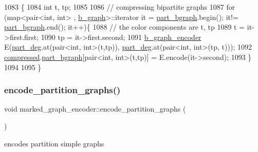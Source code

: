 \begin{DoxyCode}
1083 \{
1084   \textcolor{keywordtype}{int} t, tp;
1085 
1086   \textcolor{comment}{// compressing bipartite graphs }
1087   \textcolor{keywordflow}{for} (map<pair<int, int> , \hyperlink{classb__graph}{b\_graph}>::iterator it = \hyperlink{classmarked__graph__encoder_a5faebef707fb681c0b6c2ccf64abc04c}{part\_bgraph}.begin(); it!=
      \hyperlink{classmarked__graph__encoder_a5faebef707fb681c0b6c2ccf64abc04c}{part\_bgraph}.end(); it++)\{
1088     \textcolor{comment}{// the color components are t, tp}
1089     t = it->first.first; 
1090     tp = it->first.second; 
1091     \hyperlink{classb__graph__encoder}{b\_graph\_encoder} E(\hyperlink{classmarked__graph__encoder_a55ea2edb2609dfc287432f61900d6ad1}{part\_deg}.at(pair<int, int>(t,tp)),
      \hyperlink{classmarked__graph__encoder_a55ea2edb2609dfc287432f61900d6ad1}{part\_deg}.at(pair<int, int>(tp, t)));
1092     \hyperlink{classmarked__graph__encoder_ac2ded200860fdd2321f86dd76b28bcb3}{compressed}.\hyperlink{classmarked__graph__compressed_a7b3267063fba30b45eb21b3ba4e07536}{part\_bgraph}[pair<int, int>(t,tp)] = E.encode(it->second);
1093   \}
1094 
1095 \}
\end{DoxyCode}
\mbox{\label{classmarked__graph__encoder_a654463d4b256b84225f5944b5e361ebf}} 
\subsubsection{\texorpdfstring{encode\+\_\+partition\+\_\+graphs()}{encode\_partition\_graphs()}}
{\footnotesize\ttfamily void marked\+\_\+graph\+\_\+encoder\+::encode\+\_\+partition\+\_\+graphs (\begin{DoxyParamCaption}{ }\end{DoxyParamCaption})\hspace{0.3cm}{\ttfamily [private]}}



encodes partition simple graphs 


